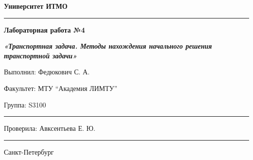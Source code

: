 \documentclass[12pt]{article}
\begin{document}
\pagestyle{empty}
\begin{center}
\large{\textbf{Университет ИТМО}}
\end{center}
\rule{525pt}{1pt}
\par\bigskip\par\bigskip\par\bigskip\par\bigskip\par\bigskip\par\bigskip\par\bigskip\par\bigskip
\begin{center}
\Large
\textbf{Лабораторная работа №4}

\textbf{\textit{«Транспортная задача. Методы нахождения начального решения транспортной задачи»}}


\end{center}
\par\bigskip\par\bigskip\par\bigskip\par\bigskip\par\bigskip\par\bigskip\par\bigskip\par\bigskip\par\bigskip\par\bigskip\par\bigskip\par\bigskip\par\bigskip\par\bigskip      
\begin{flushright}
\large
Выполнил: Федюкович С. А.
\par\bigskip
Факультет: МТУ “Академия ЛИМТУ”
\par\bigskip
Группа: S3100                       
\par\bigskip\par\bigskip\par\bigskip

\rule{150pt}{0.5pt}
\par\bigskip\par\bigskip\par\bigskip\par\bigskip                                                            
 Проверила: Авксентьева Е. Ю.
\par\bigskip \par\bigskip

\rule{150pt}{0.5pt}
\end{flushright}
\par\bigskip\par\bigskip\par\bigskip\par\bigskip\par\bigskip\par\bigskip\par\bigskip\par\bigskip\par\bigskip\par\bigskip     
\begin{center}
\large
Санкт-Петербург
\par{}
\end{center}
\newpage
\end{document}
